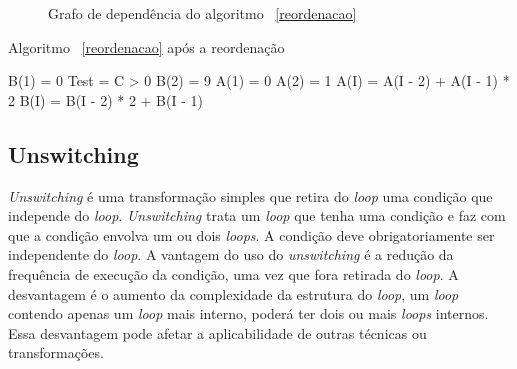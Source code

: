 \begin{figure}
\centering
\label{graph_statement_reordering}
\caption{Grafo de dependência do algoritmo ~\ref{reordenacao}}
\end{figure}

\begin{algorithm}
\caption{Algoritmo ~\ref{reordenacao} após a reordenação}
\label{reordenado}
\begin{algorithmic}[1]

\STATE B(1) = 0
\STATE Test = C > 0
 \STATE B(2) = 9 \ENDIF
\STATE A(1) = 0
 \STATE A(2) = 1 \ENDIF
{}
\STATE A(I) = A(I - 2) + A(I - 1) * 2
\STATE B(I) = B(I - 2) * 2 + B(I - 1) 
\ENDFOR

\end{algorithmic}
\end{algorithm}


\subsection{Unswitching}

\textit{Unswitching} é uma transformação simples que retira do \textit{loop} 
uma condição que independe do \textit{loop}. 
\textit{Unswitching} trata um \textit{loop} que tenha uma condição e faz com 
que a condição envolva um ou dois \textit{loops}. 
A condição deve obrigatoriamente ser independente do \textit{loop}.
A vantagem do uso do \textit{unswitching} é a redução da frequência de execução da 
condição, uma vez que fora retirada do \textit{loop}. 
A desvantagem é o aumento da complexidade da estrutura do \textit{loop}, 
um \textit{loop} contendo apenas um \textit{loop} mais interno,
poderá ter dois ou mais \textit{loops} internos. 
Essa desvantagem pode afetar a aplicabilidade de outras técnicas ou
transformações.


